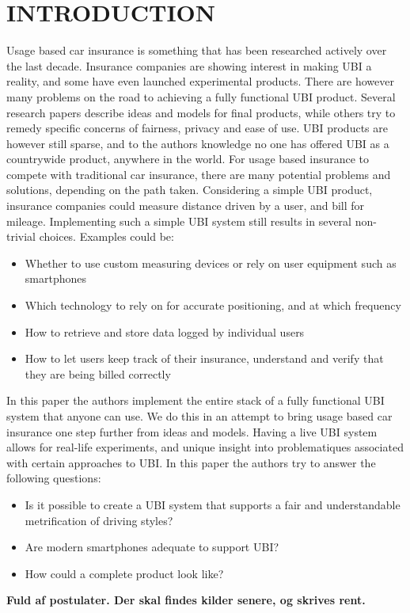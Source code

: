 \section{INTRODUCTION}\label{sec:intro}
Usage based car insurance is something that has been researched actively over the last decade. Insurance companies are showing interest in making UBI a reality, and some have even launched experimental products. There are however many problems on the road to achieving a fully functional UBI product. Several research papers describe ideas and models for final products, while others try to remedy specific concerns of fairness, privacy and ease of use. UBI products are however still sparse, and to the authors knowledge no one has offered UBI as a countrywide product, anywhere in the world.
For usage based insurance to compete with traditional car insurance, there are many potential problems and solutions, depending on the path taken. Considering a simple UBI product, insurance companies could measure distance driven by a user, and bill for mileage. Implementing such a simple UBI system still results in several non-trivial choices. Examples could be:

\begin{itemize}
\item Whether to use custom measuring devices or rely on user equipment such as smartphones
\item Which technology to rely on for accurate positioning, and at which frequency
\item How to retrieve and store data logged by individual users
\item How to let users keep track of their insurance, understand and verify that they are being billed correctly
\end{itemize}

In this paper the authors implement the entire stack of a fully functional UBI system that anyone can use. We do this in an attempt to bring usage based car insurance one step further from ideas and models. Having a live UBI system allows for real-life experiments, and unique insight into problematiques associated with certain approaches to UBI. In this paper the authors try to answer the following questions:

\begin{itemize}
\item Is it possible to create a UBI system that supports a fair and understandable metrification of driving styles?
\item Are modern smartphones adequate to support UBI?
\item How could a complete product look like?
\end{itemize}

\textbf{Fuld af postulater. Der skal findes kilder senere, og skrives rent.}